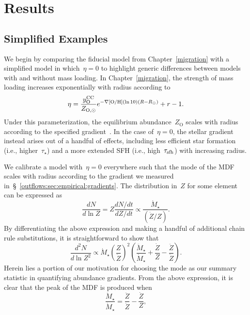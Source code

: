 
\section{Results}
\label{outflows:sec:results}

\subsection{Simplified Examples}
\label{outflows:sec:simplified-example}

We begin by comparing the fiducial model from Chapter~\ref{migration} with a
simplified model in which~$\eta = 0$ to highlight generic differences between
models with and without mass loading.
In Chapter~\ref{migration}, the strength of mass loading increases
exponentially with radius according to
\begin{equation}
\eta = \frac{y_\text{O}^\text{CC}}{Z_{\text{O},\odot}}
e^{-\nabla\text{[O/H]} (\ln 10) (R - R_\odot)} + r - 1.
\end{equation}
Under this parameterization, the equilibrium abundance~$Z_\text{O}$ scales with
radius according to the specified gradient~.
In the case of~$\eta = 0$, the stellar gradient instead arises out of a handful
of effects, including less efficient star formation (i.e., higher~$\tau_\star$)
and a more extended SFH (i.e., high~$\tau_\text{sfh}$) with increasing radius.
\par
We calibrate a model with~$\eta = 0$ everywhere such that the mode of the MDF
scales with radius according to the gradient we measured
in~\S~\ref{outflows:sec:empirical:gradients}.
The distribution in~$Z$ for some element can be expressed as
\begin{equation}
\frac{dN}{d \ln Z} = Z \frac{dN / dt}{dZ / dt}
\propto \frac{\dot{M}_\star}{(\dot{Z} / Z)}.
\end{equation}
By differentiating the above expression and making a handful of additional
chain rule substitutions, it is straightforward to show that
\begin{equation}
\frac{d^2N}{d \ln Z^2} \propto \dot{M}_\star
\left(\frac{Z}{\dot{Z}}\right)^2
\left(
\frac{\ddot{M}_\star}{\dot{M}_\star} + \frac{\dot{Z}}{Z} -
\frac{\ddot{Z}}{\dot{Z}}
\right).
\end{equation}
Herein lies a portion of our motivation for choosing the mode as our summary
statistic in quantifying abundance gradients.
From the above expression, it is clear that the peak of the MDF is produced
when
\begin{equation}
\frac{\ddot{M}_\star}{\dot{M}_\star} = \frac{\ddot{Z}}{\dot{Z}} -
\frac{\dot{Z}}{Z},
\end{equation}
